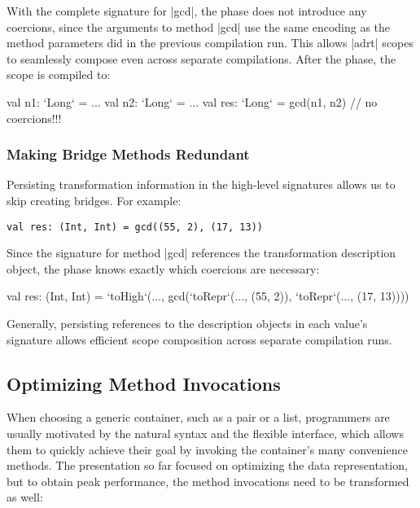 With the complete signature for |gcd|, the \coerce{} phase does not introduce any coercions, since the arguments to method |gcd| use the same encoding as the method parameters did in the previous compilation run. This allows |adrt| scopes to seamlessly compose even across separate compilations. After the \commit{} phase, the scope is compiled to:

\begin{lstlisting-nobreak}
val n1: `Long` = ...
val n2: `Long` = ...
val res: `Long` = gcd(n1, n2) // no coercions!!!
\end{lstlisting-nobreak}


\subsubsection*{Making Bridge Methods Redundant}

Persisting transformation information in the high-level signatures allows us to skip creating bridges. For example:


\begin{lstlisting}
val res: (Int, Int) = gcd((55, 2), (17, 13))
\end{lstlisting}

Since the signature for method |gcd| references the transformation description object, the \coerce{} phase knows exactly which coercions are necessary:

\begin{lstlisting-nobreak}
val res: (Int, Int) = `toHigh`(...,
  gcd(`toRepr`(..., (55, 2)), `toRepr`(..., (17, 13))))
\end{lstlisting-nobreak}

Generally, persisting references to the description objects in each value's signature allows efficient scope composition across separate compilation runs.


\subsection{Optimizing Method Invocations}
\label{sec:ildl:method}


When choosing a generic container, such as a pair or a list, programmers are usually motivated by the natural syntax and the flexible interface, which allows them to quickly achieve their goal by invoking the container's many convenience methods. The presentation so far focused on optimizing the data representation, but to obtain peak performance, the method invocations need to be transformed as well:

